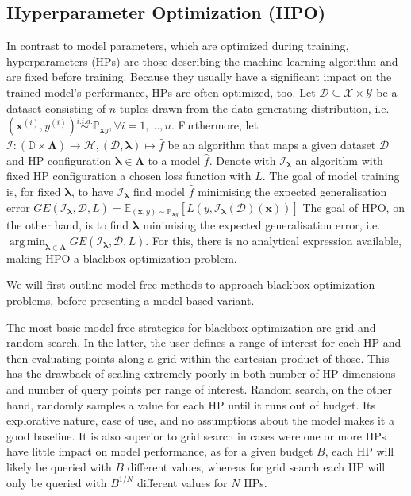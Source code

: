 \documentclass[twoside,11pt]{article}
\DeclareMathOperator*{\argmin}{arg\,min}
\begin{document}
\subsection{Hyperparameter Optimization (HPO)}
In contrast to model parameters, which are optimized during training, hyperparameters (HPs) are those describing the machine learning algorithm and are fixed before training.
Because they usually have a significant impact on the trained model's performance, HPs are often optimized, too.
Let $\mathcal{D}\subseteq\mathcal{X}\times\mathcal{Y}$ be a dataset consisting of $n$
tuples drawn from the data-generating distribution, i.e. $(\boldsymbol{x}^{(i)}, y^{(i)})\stackrel{i.i.d.}{\sim}\mathbb{P}_{\boldsymbol{x}y},\forall i=1,...,n$.
Furthermore, let $\mathcal{I}:(\mathbb{D}\times\boldsymbol\Lambda)\rightarrow\mathcal{H}, (\mathcal{D},\boldsymbol\lambda)\mapsto\hat{f}$
be an algorithm that maps a given dataset $\mathcal{D}$ and HP configuration $\boldsymbol\lambda\in\boldsymbol\Lambda$ to a model $\hat{f}$.
Denote with $\mathcal{I}_{\boldsymbol\lambda}$ an algorithm with fixed HP configuration a chosen loss function with $L$.
The goal of model training is, for fixed $\boldsymbol\lambda$, to have $\mathcal{I}_{\boldsymbol\lambda}$ find model $\hat{f}$ minimising the expected generalisation error
$GE(\mathcal{I}_{\boldsymbol\lambda},\mathcal{D},L)=\mathbb{E}_{(\boldsymbol{x},y)\sim\mathbb{P}_{\boldsymbol{x}y}}[L(y,\mathcal{I}_{\boldsymbol\lambda}(\mathcal{D})(\boldsymbol{x}))]$
The goal of HPO, on the other hand, is to find $\boldsymbol\lambda$ minimising the expected generalisation error,
i.e. $\argmin_{\boldsymbol\lambda\in\boldsymbol\Lambda} GE(\mathcal{I}_{\boldsymbol\lambda},\mathcal{D},L)$.
For this, there is no analytical expression available, making HPO a blackbox optimization problem. \citep[pp. 2f]{10.1145/3610536}

We will first outline model-free methods to approach blackbox optimization problems, before presenting a model-based variant.

The most basic model-free strategies for blackbox optimization are grid and random search.
In the latter, the user defines a range of interest for each HP and then evaluating points along a grid within the cartesian product of those.
This has the drawback of scaling extremely poorly in both number of HP dimensions and number of query points per range of interest.
Random search, on the other hand, randomly samples a value for each HP until it runs out of budget. Its explorative nature, ease of use, and no assumptions
about the model makes it a good baseline. It is also superior to grid search in cases were one or more HPs have little impact on model performance,
as for a given budget $B$, each HP will likely be queried with $B$ different values, whereas for grid search each HP will only be queried with $B^{1/N}$
different values for $N$ HPs. \citep[chap. 1.3]{feurer_hyperparameter_2019}
\end{document}
